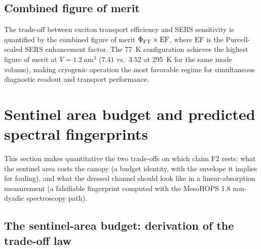 \documentclass[11pt,a4paper]{article}
\begin{document}
\subsection{Combined figure of merit}

The trade-off between exciton transport efficiency and SERS sensitivity is quantified by the combined figure of merit $\Phi_{\rm FT} \times \mathrm{EF}$, where $\mathrm{EF}$ is the Purcell-scaled SERS enhancement factor. The \qty{77}{\kelvin} configuration achieves the highest figure of merit at $V = \qty{1.2}{\nm\cubed}$ ($7.41$ vs.~$3.52$ at \qty{295}{\kelvin} for the same mode volume), making cryogenic operation the most favorable regime for simultaneous diagnostic readout and transport performance.



\section{Sentinel area budget and predicted spectral fingerprints}
\label{SI-sec:budget}

This section makes quantitative the two trade-offs on which claim F2 rests: what the sentinel area costs the canopy (a budget identity, with the envelope it implies for fouling), and what the dressed channel should look like in a linear-absorption measurement (a falsifiable fingerprint computed with the MesoHOPS 1.8 non-dyadic spectroscopy path).

\subsection{The sentinel-area budget: derivation of the trade-off law}
\end{document}
